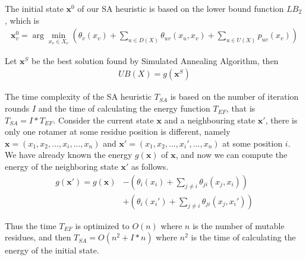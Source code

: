 The initial state $\mathbf{x}^0$ of our SA heuristic is based on the lower bound function $LB_2$, which is
\begin{align*}
\mathbf{x}_v^0\!=\!\arg\!\min_{x_v\in X_v}\left(\theta_v(x_v)\!+\!\sum_{u\in D(X)}\theta_{uv}(x_u,x_v)\!+\!\sum_{u\in U(X)}p_{uv}(x_v)\right)
\end{align*}

Let $\mathbf{x}^{S}$ be the best solution found by Simulated Annealing Algorithm, then
\begin{align*}
  UB(X)=g(\mathbf{x}^{S})
\end{align*}

The time complexity of the SA heuristic $T_{SA}$ is based on the number of iteration rounds $I$ and the time of calculating the energy function $T_{EF}$, that is $T_{SA}=I*T_{EF}$. Consider the current state $\mathbf{x}$ and a neighbouring state $\mathbf{x}'$, there is only one rotamer at some residue position is different, namely $\mathbf{x}=(x_1,x_2,...,x_i,...,x_n)$ and $\mathbf{x}'=(x_1,x_2,...,x_i',...,x_n)$ at some position $i$. We have already known the energy $g(\mathbf{x})$ of $\mathbf{x}$, and now we can compute the energy of the neighboring state $\mathbf{x}'$ as follows.
\begin{align*}
g(\mathbf{x}')=g(\mathbf{x})&-\left(\theta_i(x_i)+\sum_{j\neq i}\theta_{ji}(x_j,x_i)\right)\\
&+\left(\theta_i(x_i')+\sum_{j\neq i}\theta_{ji}(x_j,x_i')\right)
\end{align*}

Thus the time $T_{EF}$ is optimized to $O(n)$ where $n$ is the number of mutable residues, and then $T_{SA}=O(n^2+I*n)$ where $n^2$ is the time of calculating the energy of the initial state.

